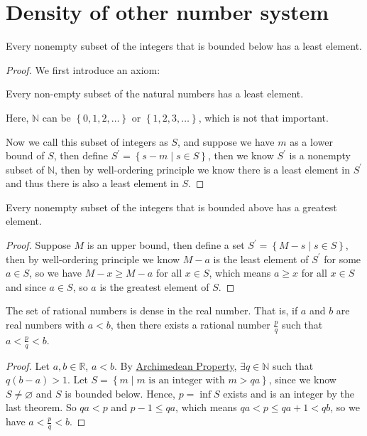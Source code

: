 \section{Density of other number system}
\begin{theorem}
  Every nonempty subset of the integers that is bounded below has a least element.
\end{theorem}

\begin{proof}
  We first introduce an axiom:
  \begin{theorem}
    Every non-empty subset of the natural numbers has a least element.
  \end{theorem}
  \begin{note}
    Here, \(\mathbb{N} \) can be \(\left\{ 0,1,2,\dots  \right\} \) or \(\left\{ 1,2,3,\dots  \right\} \), which is not that important.
  \end{note}
  Now we call this subset of integers as \(S\), and suppose we have \(m\) as a lower bound of \(S\), then define \(S^{\prime} = \left\{ s - m \mid s \in S \right\} \), then we know \(S^{\prime} \) is a nonempty subset of \(\mathbb{N} \), then by well-ordering principle we know there is a least element in \(S^{\prime} \)  and thus there is also a least element in \(S\). 
\end{proof}

\begin{corollary}
  Every nonempty subset of the integers that is bounded above has a greatest element.
\end{corollary}
\begin{proof}
  Suppose \(M\) is an upper bound, then define a set \(S^{\prime} = \left\{ M - s \mid s \in S \right\} \), then by well-ordering principle we know \(M - a\) is the least element of \(S^{\prime} \) for some \(a \in S\), so we have \(M - x \ge M - a\) for all \(x \in S\), which means \(a \ge x\) for all \(x \in S\) and since \(a \in S\), so \(a\) is the greatest element of \(S\).          
\end{proof}

\begin{theorem}\label{thm: rational dense in real}
  The set of rational numbers is dense in the real number. That is, if \(a\) and \(b\) are real numbers with \(a<b\), then there exists a rational number \(\frac{p}{q}\) such that \(a < \frac{p}{q} < b\).     
\end{theorem}
\begin{proof}
  Let \(a,b \in \mathbb{R} \), \(a<b\). By \hyperref[thm: Archimedean property]{Archimedean Property}, \(\exists q \in \mathbb{N} \) such that \(q(b-a)>1\). Let \(S = \left\{ m \mid m \text{ is an integer with } m > qa \right\} \), since we know \(S \neq \varnothing \) and \(S\) is bounded below. Hence, \(p=\inf S\) exists and is an integer by the last theorem. So \(qa < p\) and \(p-1\le qa\), which means \(qa<p \le qa+1 < qb\), so we have \(a < \frac{p}{q} < b\). 
\end{proof}
